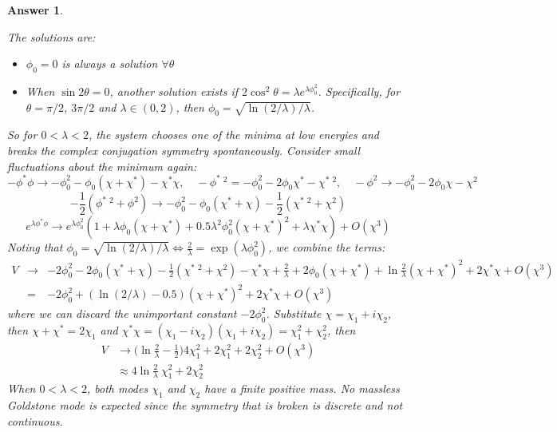 \documentclass[a4paper]{article}
\newtheorem{ans}{Answer}[section]
\theoremstyle{new}
\begin{document}
\begin{ans}
\begin{enumerate}[label=(\alph*)]
The solutions are:
\begin{itemize}
    \item $\phi_0=0$ is always a solution $\forall\theta$
    \item When $\sin2\theta=0$, another solution exists if $2\cos^2\theta=\lambda e^{\lambda\phi_0^2}$. Specifically, for $\theta=\pi/2$, $3\pi/2$ and $\lambda\in(0,2)$, then $\phi_0=\sqrt{\ln(2/\lambda)/\lambda}$.
\end{itemize}
So for $0<\lambda<2$, the system chooses one of the minima at low energies and breaks the complex conjugation symmetry spontaneously. Consider small fluctuations about the minimum again: 
$$-\phi^*\phi\rightarrow-\phi_0^2-\phi_0(\chi+\chi^*)-\chi^*\chi,\quad-\phi^*~^2=-\phi_0^2-2\phi_0\chi^*-\chi^*~^2,\quad-\phi^2\rightarrow-\phi_0^2-2\phi_0\chi-\chi^2$$
$$-\frac{1}{2}(\phi^*~^2+\phi^2)\rightarrow-\phi_0^2-\phi_0(\chi^*+\chi)-\frac{1}{2}(\chi^*~^2+\chi^2)$$
$$e^{\lambda\phi^*\phi}\rightarrow e^{\lambda\phi_0^2}(1+\lambda\phi_0(\chi+\chi^*)+0.5\lambda^2\phi_0^2(\chi+\chi^*)^2+\lambda\chi^*\chi)+O(\chi^3)$$
Noting that $\phi_0=\sqrt{\ln(2/\lambda)/\lambda}\iff\frac{2}{\lambda}=\exp(\lambda\phi_0^2)$, we combine the terms:
\begin{eqnarray}
    V&\rightarrow&-2\phi_0^2-2\phi_0(\chi^*+\chi)-\frac{1}{2}(\chi^*~^2+\chi^2)-\chi^*\chi+\frac{2}{\lambda}+2\phi_0(\chi+\chi^*)+\ln\frac{2}{\lambda}(\chi+\chi^*)^2+2\chi^*\chi+O(\chi^3)\nonumber\\&=&-2\phi_0^2+(\ln(2/\lambda)-0.5)(\chi+\chi^*)^2+2\chi^*\chi+O(\chi^3)\nonumber
\end{eqnarray}
where we can discard the unimportant constant $-2\phi_0^2$. Substitute $\chi=\chi_1+i\chi_2$, then $\chi+\chi^*=2\chi_1$ and $\chi^*\chi=(\chi_1-i\chi_2)(\chi_1+i\chi_2)=\chi_1^2+\chi_2^2$, then
\begin{align}
    V&\rightarrow\bigg(\ln\frac{2}{\lambda}-\frac{1}{2}\bigg)4\chi_1^2+2\chi_1^2+2\chi_2^2+O(\chi^3)\nonumber\\&\approx4\ln\frac{2}{\lambda}~\chi_1^2+2\chi_2^2\nonumber
\end{align}
When $0<\lambda<2$, both modes $\chi_1$ and $\chi_2$ have a finite positive mass. No massless Goldstone mode is expected since the symmetry that is broken is discrete and not continuous.
\end{enumerate}
\end{ans}
\end{document}
